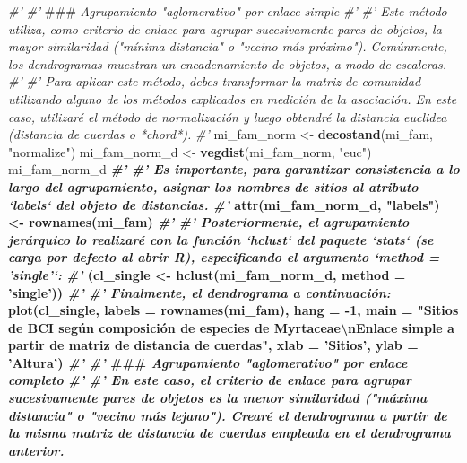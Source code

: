 \documentclass[11pt,]{article}
\newenvironment{Shaded}{\begin{snugshade}}{\end{snugshade}}
\newcommand{\KeywordTok}[1]{\textcolor[rgb]{0.13,0.29,0.53}{\textbf{#1}}}
\newcommand{\DataTypeTok}[1]{\textcolor[rgb]{0.13,0.29,0.53}{#1}}
\newcommand{\DecValTok}[1]{\textcolor[rgb]{0.00,0.00,0.81}{#1}}
\newcommand{\CharTok}[1]{\textcolor[rgb]{0.31,0.60,0.02}{#1}}
\newcommand{\StringTok}[1]{\textcolor[rgb]{0.31,0.60,0.02}{#1}}
\newcommand{\CommentTok}[1]{\textcolor[rgb]{0.56,0.35,0.01}{\textit{#1}}}
\newcommand{\OperatorTok}[1]{\textcolor[rgb]{0.81,0.36,0.00}{\textbf{#1}}}
\newcommand{\AlertTok}[1]{\textcolor[rgb]{0.94,0.16,0.16}{#1}}
\newcommand{\NormalTok}[1]{#1}
\begin{document}
\begin{Shaded}
\begin{Highlighting}[]
\CommentTok{#' }
\CommentTok{#' }\AlertTok{###}\CommentTok{ Agrupamiento "aglomerativo" por enlace simple}
\CommentTok{#' }
\CommentTok{#' Este método utiliza, como criterio de enlace para agrupar sucesivamente pares de objetos, la mayor similaridad ("mínima distancia" o "vecino más próximo"). Comúnmente, los dendrogramas muestran un encadenamiento de objetos, a modo de escaleras.}
\CommentTok{#' }
\CommentTok{#' Para aplicar este método, debes transformar la matriz de comunidad utilizando alguno de los métodos explicados en medición de la asociación. En este caso, utilizaré el método de normalización y luego obtendré la distancia euclidea (distancia de cuerdas o *chord*).}
\CommentTok{#' }
\NormalTok{mi_fam_norm <-}\StringTok{ }\KeywordTok{decostand}\NormalTok{(mi_fam, }\StringTok{"normalize"}\NormalTok{)}
\NormalTok{mi_fam_norm_d <-}\StringTok{ }\KeywordTok{vegdist}\NormalTok{(mi_fam_norm, }\StringTok{"euc"}\NormalTok{)}
\NormalTok{mi_fam_norm_d }\OperatorTok{%
\CommentTok{#'}
\CommentTok{#' Es importante, para garantizar consistencia a lo largo del agrupamiento, asignar los nombres de sitios al atributo `labels` del objeto de distancias.}
\CommentTok{#' }
\KeywordTok{attr}\NormalTok{(mi_fam_norm_d, }\StringTok{"labels"}\NormalTok{) <-}\StringTok{ }\KeywordTok{rownames}\NormalTok{(mi_fam)}
\CommentTok{#' }
\CommentTok{#' Posteriormente, el agrupamiento jerárquico lo realizaré con la función `hclust` del paquete `stats` (se carga por defecto al abrir R), especificando el argumento `method = 'single'`:}
\CommentTok{#' }
\NormalTok{(cl_single <-}\StringTok{ }\KeywordTok{hclust}\NormalTok{(mi_fam_norm_d, }\DataTypeTok{method =} \StringTok{'single'}\NormalTok{))}
\CommentTok{#' }
\CommentTok{#' Finalmente, el dendrograma a continuación:}
\KeywordTok{plot}\NormalTok{(cl_single, }\DataTypeTok{labels =} \KeywordTok{rownames}\NormalTok{(mi_fam), }\DataTypeTok{hang =} \OperatorTok{-}\DecValTok{1}\NormalTok{,}
     \DataTypeTok{main =} \StringTok{"Sitios de BCI según composición de especies de Myrtaceae}\CharTok{\textbackslash{}n}\StringTok{Enlace simple a partir de matriz de distancia de cuerdas"}\NormalTok{,}
     \DataTypeTok{xlab =} \StringTok{'Sitios'}\NormalTok{, }\DataTypeTok{ylab =} \StringTok{'Altura'}\NormalTok{)}
\CommentTok{#' }
\CommentTok{#' }\AlertTok{###}\CommentTok{ Agrupamiento "aglomerativo" por enlace completo}
\CommentTok{#' }
\CommentTok{#' En este caso, el criterio de enlace para agrupar sucesivamente pares de objetos es la menor similaridad ("máxima distancia" o "vecino más lejano"). Crearé el dendrograma a partir de la misma matriz de distancia de cuerdas empleada en el dendrograma anterior.}
}
\end{Highlighting}
\end{Shaded}
\end{document}
